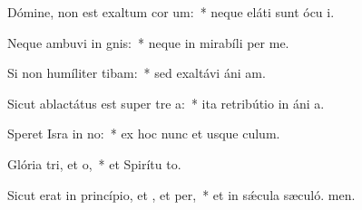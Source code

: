 \item Dómine, non est exaltum cor um:~* neque eláti sunt ócu i.
\item Neque ambuvi in gnis:~* neque in mirabíli per me.
\item Si non humíliter tibam:~* sed exaltávi áni am.
\item Sicut ablactátus est super tre a:~* ita retribútio in áni a.
\item Speret Isra in no:~* ex hoc nunc et usque  culum.
\item Glória tri, et o,~* et Spirítu to.
\item Sicut erat in princípio, et , et per,~* et in sǽcula sæculó. men.
